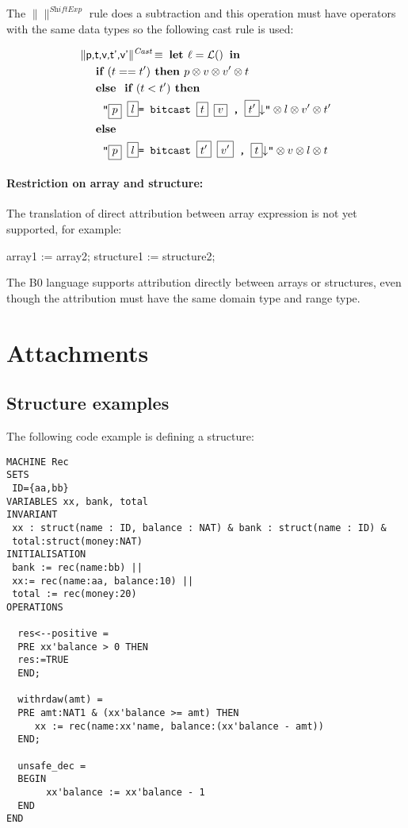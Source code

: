 \documentclass[10pt,a4paper]{article}
\newcommand{\trad}[2]{\ensuremath{\lVert \textsf{#1} \rVert^{\textit{#2}}}}
\newcommand{\nl}[0]{\ensuremath{\downarrow}}
\DeclareMathOperator{\isdef}{\equiv}
\DeclareMathOperator{\lbl}{\mathcal{L}()}
\newcommand{\llvm}[1]{\texttt{#1}}
\newcommand{\IF}[0]{\textbf{ if }}
\newcommand{\ELSE}[0]{\textbf{ else }}
\newcommand{\THEN}[0]{\textbf{ then }}
\newcommand{\LET}[0]{\textbf{ let }}
\newcommand{\IN}[0]{\textbf{ in }}
\newcommand{\PH}[1]{\framebox{$#1$}}
\newcommand{\sep}[0]{\otimes}
\begin{document}
The \trad{}{ShiftExp} rule does a subtraction and this operation must have operators 
with the same data types so the following cast rule is used:

\begin{align*}
&\trad{p,t,v,t',v'}{Cast} \isdef \LET  \ell = \lbl \IN \\
&\quad \IF ( t == t') \THEN p \sep v \sep v' \sep t  \\
&\quad \ELSE \IF (t<t') \THEN \\
&\quad \quad \llvm{"\PH{p} \PH{l}= bitcast \PH{t} \PH{v} , \PH{t'}\nl"}  \sep l \sep v' \sep t'\\ 
&\quad \ELSE \\ 
&\quad \quad \llvm{"\PH{p} \PH{l}= bitcast \PH{t'} \PH{v'} , \PH{t}\nl"} \sep v \sep l \sep t \\ 
\end{align*}










\paragraph{Restriction on array and structure:} The translation of direct attribution
 between array expression is not yet supported, for example:

\begin{pascalcode}
 array1 := array2;
 structure1 := structure2;
\end{pascalcode}

The B0 language supports attribution directly between arrays or structures, even though the attribution
must have the same domain type and range type. 


\section*{Attachments}

\subsection{Structure examples}

The following code example is defining a structure:


\begin{verbatim}
MACHINE Rec
SETS
 ID={aa,bb}
VARIABLES xx, bank, total
INVARIANT
 xx : struct(name : ID, balance : NAT) & bank : struct(name : ID) &
 total:struct(money:NAT)
INITIALISATION 
 bank := rec(name:bb) ||
 xx:= rec(name:aa, balance:10) ||
 total := rec(money:20)
OPERATIONS

  res<--positive = 
  PRE xx'balance > 0 THEN
  res:=TRUE
  END;

  withrdaw(amt) = 
  PRE amt:NAT1 & (xx'balance >= amt) THEN
     xx := rec(name:xx'name, balance:(xx'balance - amt))
  END;
  
  unsafe_dec = 
  BEGIN
       xx'balance := xx'balance - 1
  END
END
\end{verbatim}
\end{document}
